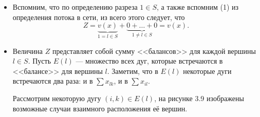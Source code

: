 \begin{itemize}[nosep]
	\item[\fbox{1}] Вспомним, что по определению разреза $1 \in S$, а также вспомним (1) из определения потока в сети, из всего этого следует, что
	\[
	Z = \underbrace{v(x)}_{1 = l \in S} + \underbrace{0 + \dots + 0}_{1 \neq l \in S} = v(x).
	\]

	\item[\fbox{2}] Величина $Z$ представляет собой сумму <<балансов>> для каждой вершины $l \in S$. Пусть $E(l)$ --- множество всех дуг, которые встречаются в <<балансе>> для вершины $l$. Заметим, что в $E(l)$ некоторые дуги встречаются два раза: и в $\sum x_{lk}$, и в $\sum {x_{il}}$.
	
	Рассмотрим некоторую дугу $(i, k) \in E(l)$, на рисунке 3.9 изображены возможные случаи взаимного расположения её вершин.
	

\end{itemize}
